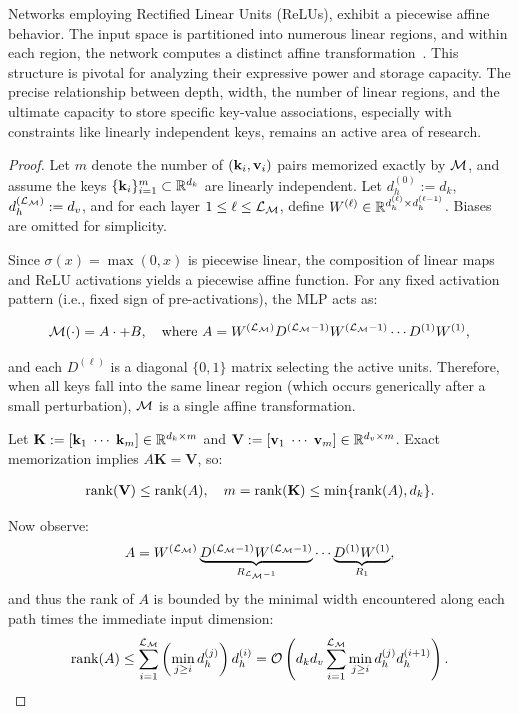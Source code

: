 Networks employing Rectified Linear Units (ReLUs), exhibit a piecewise affine behavior. The input space is partitioned into numerous linear regions, and within each region, the network computes a distinct affine transformation~\citet{montufar2014numberlinearregions, pascanu2014numberresponseregionsdeep}. This structure is pivotal for analyzing their expressive power and storage capacity. The precise relationship between depth, width, the number of linear regions, and the ultimate capacity to store specific key-value associations, especially with constraints like linearly independent keys, remains an active area of research.

\begin{proof}

Let $m$ denote the number of $(\mathbf{k}_i, \mathbf{v}_i)$ pairs memorized exactly by $\mathcal{M}$, and assume the keys $\{\mathbf{k}_i\}_{i=1}^m \subset \mathbb{R}^{d_k}$ are linearly independent. Let $d_h^{(0)} := d_k$, $d_h^{(\mathcal{L}_{\mathcal{M}})} := d_v$, and for each layer $1 \le \ell \le \mathcal{L}_{\mathcal{M}}$, define $W^{(\ell)} \in \mathbb{R}^{d_h^{(\ell)} \times d_h^{(\ell-1)}}$. Biases are omitted for simplicity.

Since $\sigma(x) = \max(0,x)$ is piecewise linear, the composition of linear maps and ReLU activations yields a piecewise affine function. For any fixed activation pattern (i.e., fixed sign of pre-activations), the MLP acts as:

\begin{align*}
\mathcal{M}(\cdot) = A \cdot + B, \quad \text{where } A = W^{(\mathcal{L}_{\mathcal{M}})} D^{(\mathcal{L}_{\mathcal{M}} - 1)} W^{(\mathcal{L}_{\mathcal{M}} - 1)} \cdots D^{(1)} W^{(1)},
\end{align*}

and each $D^{(\ell)}$ is a diagonal $\{0,1\}$ matrix selecting the active units. Therefore, when all keys fall into the same linear region (which occurs generically after a small perturbation), $\mathcal{M}$ is a single affine transformation.

Let $\mathbf{K} := [\mathbf{k}_1\; \cdots\; \mathbf{k}_m] \in \mathbb{R}^{d_k \times m}$ and $\mathbf{V} := [\mathbf{v}_1\; \cdots\; \mathbf{v}_m] \in \mathbb{R}^{d_v \times m}$. Exact memorization implies $A \mathbf{K} = \mathbf{V}$, so:

\begin{align*}
\operatorname{rank}(\mathbf{V}) \le \operatorname{rank}(A), \quad m = \operatorname{rank}(\mathbf{K}) \le \min\{\operatorname{rank}(A), d_k\}.
\end{align*}

Now observe:
\begin{align*}
A = W^{(\mathcal{L}_{\mathcal{M}})} \underbrace{D^{(\mathcal{L}_{\mathcal{M}}-1)} W^{(\mathcal{L}_{\mathcal{M}} -1)}}_{R_{\mathcal{L}_{\mathcal{M}} -1}} \cdots \underbrace{D^{(1)} W^{(1)}}_{R_1},
\end{align*}
and thus the rank of $A$ is bounded by the minimal width encountered along each path times the immediate input dimension:
\begin{align*}
\operatorname{rank}(A) \le \sum_{i=1}^{\mathcal{L}_{\mathcal{M}}} \left( \min_{j \ge i} d_h^{(j)} \right) d_h^{(i)} 
= \mathcal{O}\left( d_k d_v \sum_{i=1}^{\mathcal{L}_{\mathcal{M}}} \min_{j \ge i} d_h^{(j)} d_h^{(i+1)} \right).
\end{align*}


\end{proof}
